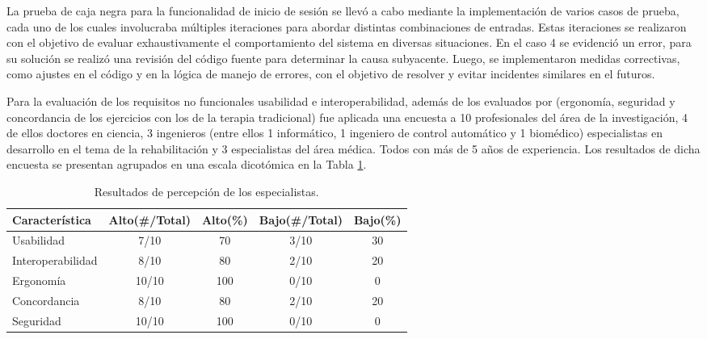 \newpage
La prueba de caja negra para la funcionalidad de inicio de sesión se llevó a cabo mediante la implementación de varios casos de prueba, cada uno de los cuales involucraba múltiples iteraciones para abordar distintas combinaciones de entradas. Estas iteraciones se realizaron con el objetivo de evaluar exhaustivamente el comportamiento del sistema en diversas situaciones. En el caso 4 se evidenció un error, para su solución se realizó una revisión del código fuente para determinar la causa subyacente. Luego, se implementaron medidas correctivas, como ajustes en el código y en la lógica de manejo de errores, con el objetivo de resolver y evitar incidentes similares en el futuros.

Para la evaluación de los requisitos no funcionales usabilidad e interoperabilidad, además de los evaluados por \cite{franco2016sistema} (ergonomía, seguridad y concordancia de los ejercicios con los de la terapia tradicional) fue aplicada una encuesta a 10 profesionales del área de la investigación, 4 de ellos doctores en ciencia, 3 ingenieros (entre ellos 1 informático, 1 ingeniero de control automático y 1 biomédico) especialistas en desarrollo en el tema de la rehabilitación y 3 especialistas del área médica. Todos con más de 5 años de experiencia. Los resultados de dicha encuesta se presentan agrupados en una escala dicotómica en la Tabla \ref{table:test}.

\begin{table}[ht]
    \centering
    \begin{tabular}{p{3cm} c c c c}
        \hline
        Característica      &  Alto(\#/Total)   &  Alto(\%) & Bajo(\#/Total)  & Bajo(\%) \\\hline
        Usabilidad          &  7/10   &  70   & 3/10  &   30\\
        Interoperabilidad   &  8/10   &  80   & 2/10  &   20\\
        Ergonomía           &  10/10  &  100  & 0/10  &   0\\
        Concordancia        &  8/10   &  80   & 2/10  &   20\\
        Seguridad           &  10/10  &  100  & 0/10  &   0\\
        \hline        
    \end{tabular}        
    \caption{Resultados de percepción de los especialistas.}
    \label{table:test}
\end{table}

